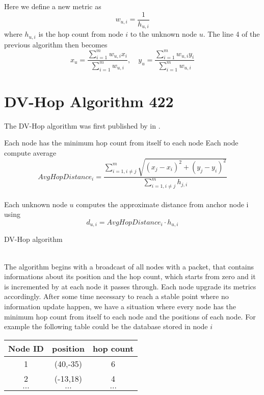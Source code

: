 \documentclass[12pt,twoside]{report}
\begin{document}
Here we define a new metric as 
\begin{equation}
    w_{u,i}=\frac{1}{h_{u,i}}
\end{equation}
where $h_{u,i}$ is the hop count from node $i$ to the unknown node $u$. The line 4 of the previous algorithm then becomes
\begin{equation}
     x_u=\frac{\sum_{i=1}^mw_{u,i}x_i}{\sum_{i=1}^mw_{u,i}},\quad y_u=\frac{\sum_{i=1}^mw_{u,i}y_i}{\sum_{i=1}^mw_{u,i}}
\end{equation}








\clearpage

\section{DV-Hop Algorithm 422}
The DV-Hop algorithm was first published by in \cite{965964}.\\
\begin{algorithm}[H]
\SetAlgoLined
{}
Each node has the minimum hop count from itself to each node\;
Each node compute average 
\begin{equation}
    AvgHopDistance_i=\frac{\sum_{i=1,i\neq j}^m\sqrt{(x_j-x_i)^2+(y_j-y_i)^2}}{\sum_{i=1,i\neq j}^mh_{j,i}}
\end{equation}\\
Each unknown node $u$ computes the approximate distance from anchor node i using 
\begin{equation}
    d_{u,i}=AvgHopDistance_i \cdot h_{u,i}
\end{equation}
 \caption{DV-Hop algorithm}
\end{algorithm}
\noindent\\
The algorithm begins with a broadcast of all nodes with a packet, that contains informations about its position and the hop count, which starts from zero and it is incremented by at each node it passes through. Each node upgrade its metrics accordingly. After some time necessary to reach a stable point where no information update happen, we have a situation where every node has the minimum hop count from itself to each node and the positions of each node. For example the following table could be the database stored in node $i$
\begin{center}
\begin{tabular}{ |c|c|c| } 
 \hline
 Node ID & position & hop count \\ 
 \hline
 \hline
 1 & (40,-35) & 6 \\ 
 2 & (-13,18) & 4 \\
 $\hdots$ & $\hdots$ & $\hdots$\\
 \hline
\end{tabular}
\end{center}
\end{document}
